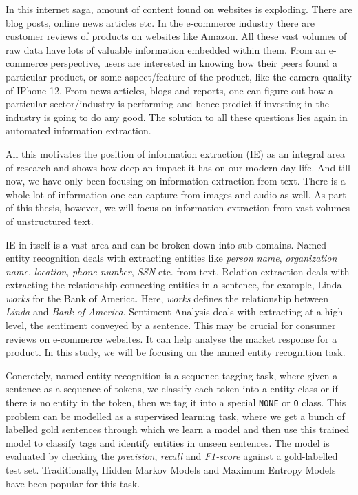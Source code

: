 In this internet saga, amount of content found on websites is exploding. There are blog posts, online news articles etc. In the e-commerce industry there are customer reviews of products on websites like Amazon. All these vast volumes of raw data have lots of valuable information embedded within them. From an e-commerce perspective, users are interested in knowing how their peers found a particular product, or some aspect/feature of the product, like the camera quality of IPhone 12. From news articles, blogs and reports, one can figure out how a particular sector/industry is performing and hence predict if investing in the industry is going to do any good. The solution to all these questions lies again in automated information extraction. 

All this motivates the position of information extraction (IE) as an integral area of research and shows how deep an impact it has on our modern-day life. And till now, we have only been focusing on information extraction from text. There is a whole lot of information one can capture from images and audio as well. As part of this thesis, however, we will focus on information extraction from vast volumes of unstructured text.

IE in itself is a vast area and can be broken down into sub-domains. Named entity recognition deals with extracting entities like \textit{person name}, \textit{organization name}, \textit{location}, \textit{phone number}, \textit{SSN} etc. from text. Relation extraction deals with extracting the relationship connecting entities in a sentence, for example, Linda \textit{works} for the Bank of America. Here, \textit{works} defines the relationship between \textit{Linda} and \textit{Bank of America}. Sentiment Analysis deals with extracting at a high level, the sentiment conveyed by a sentence. This may be crucial for consumer reviews on e-commerce websites. It can help analyse the market response for a product. In this study, we will be focusing on the named entity recognition task.

Concretely, named entity recognition is a sequence tagging task, where given a sentence as a sequence of tokens, we classify each token into a entity class or if there is no entity in the token, then we tag it into a special \texttt{NONE} or \texttt{O} class. This problem can be modelled as a supervised learning task, where we get a bunch of labelled gold sentences through which we learn a model and then use this trained model to classify tags and identify entities in unseen sentences. The model is evaluated by checking the \textit{precision}, \textit{recall} and \textit{F1-score} against a gold-labelled test set. Traditionally, Hidden Markov Models and Maximum Entropy Models have been popular for this task.

